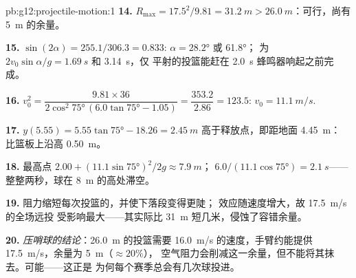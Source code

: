 \begin{solution}{pb:g12:projectile-motion:1}
\textbf{14.} $R_{\max} = 17.5^2/9.81 = \qty{31.2}{m} >
\qty{26.0}{m}$：可行，尚有 \qty{5}{m} 的余量。

\textbf{15.} $\sin(2\alpha) = 255.1/306.3 = 0.833$:
$\alpha = \ang{28.2}$ 或 \ang{61.8}；
为 $2v_0\sin\alpha/g = \qty{1.69}{s}$ 和 \qty{3.14}{s}，仅
平射的投篮能赶在 \qty{2.0}{s} 蜂鸣器响起之前完成。

\textbf{16.} $v_0^2 = \dfrac{9.81 \times 36}{2\cos^2\ang{75}\,
(6.0\tan\ang{75} - 1.05)} = \dfrac{353.2}{2.86} = 123.5$:
$v_0 = \qty{11.1}{m/s}$.

\textbf{17.} $y(5.55) = 5.55\tan\ang{75} - 18.26 = \qty{2.45}{m}$
高于释放点，即距地面 \qty{4.45}{m}：
比篮板上沿高 \qty{0.50}{m}。

\textbf{18.} 最高点 $2.00 + (11.1\sin\ang{75})^2/2g \approx
\qty{7.9}{m}$； $6.0/(11.1\cos\ang{75}) = \qty{2.1}{s}$——
整整两秒，球在 \qty{8}{m} 的高处滞空。

\textbf{19.} 阻力缩短每次投篮的，并使下落段变得更陡；
效应随速度增大，故 \qty{17.5}{m/s} 的全场远投
受影响最大——其实际比
\qty{31}{m} 短几米，侵蚀了容错余量。

\textbf{20.} \emph{压哨球的结论}：\qty{26.0}{m}
的投篮需要 \qty{16.0}{m/s} 的速度，手臂约能提供
\qty{17.5}{m/s}，余量为 \qty{5}{m}（$\approx 20\%$），
空气阻力会削减这一余量，但不能将其抹去。可能——这正是
为何每个赛季总会有几次球投进。
\end{solution}
